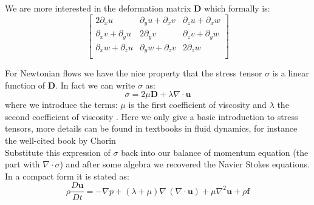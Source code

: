 We are more interested in the deformation matrix $\textbf{D}$ which formally is:
\begin{equation*}
\begin{bmatrix}
2\partial_x u & \partial_y u + \partial_x v& \partial_z u+\partial_x w\\
\partial_x v+\partial_y u & 2\partial_y v & \partial_z v +\partial_y w\\
\partial_x w +\partial_z u & \partial_y w +\partial_z v & 2\partial_z w\\
\end{bmatrix}
\end{equation*}

For Newtonian flows we have the nice property that the stress tensor $\textbf{$\sigma$}$ is a linear function of $\textbf{D}$. In fact we can write $\textbf{$\sigma$}$ as:
\begin{equation}
 \textbf{$\sigma$} = 2\mu \textbf{D} + \lambda\nabla \cdot \textbf{u}
\end{equation}
where we introduce the terms: $\mu$ is the first coefficient of viscosity and $\lambda$ the second coefficient of viscosity \cite{chorin1990mathematical}. Here we only give a basic introduction to stress tensors, more details can be found in textbooks in fluid dynamics, for instance the well-cited book by Chorin \cite{chorin1990mathematical}\\

Substitute this expression of $\textbf{$\sigma$}$ back into our balance of momentum equation (the part with $\nabla \cdot \textbf{$\sigma$}$) and after some algebra we recovered the Navier Stokes equations.\\
In a compact form it is stated as:
\begin{equation}
\rho \dfrac{D\textbf{u}}{Dt} = -\nabla p + (\lambda + \mu)\nabla \,(\nabla \cdot\textbf{u}) + \mu \nabla^2 \textbf{u} + \rho \textbf{f}
\end{equation}

